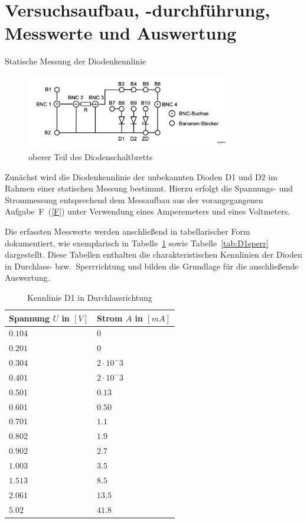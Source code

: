 \documentclass{article}
\theoremstyle{definition}
\begin{document}
\section{Versuchsaufbau, -durchführung, Messwerte und Auswertung}
\begin{aufgabe}{Statische Messung der Diodenkennlinie} 
    \aufbau
    \begin{figure}[H]
        \centering
        \includegraphics[width=0.8\textwidth]{figs/fig2_6.png}
        \caption{oberer Teil des Diodenschaltbretts\cite{anleitung}}
        \label{aufbau_2_1}
    \end{figure}
    Zunächst wird die Diodenkennlinie der unbekannten Dioden D1 und D2 im Rahmen einer statischen Messung bestimmt. 
    Hierzu erfolgt die Spannungs- und Strommessung entsprechend dem Messaufbau aus der vorangegangenen Aufgabe~F~(\ref{F}) 
    unter Verwendung eines Amperemeters und eines Voltmeters. 
    
    Die erfassten Messwerte werden anschließend in tabellarischer Form dokumentiert, wie exemplarisch in Tabelle~\ref{tab:D1duchlass} 
    sowie Tabelle~\ref{tab:D1sperr} dargestellt. Diese Tabellen enthalten die charakteristischen Kennlinien der Dioden in 
    Durchlass- bzw.\ Sperrrichtung und bilden die Grundlage für die anschließende Auswertung.
    

\begin{table}[h!]
    \centering
    \begin{tabular}{|l|l|}
    \hline
    \textbf{Spannung $U$ in $[V]$} & \textbf{Strom $A$ in $[mA]$} \\
    \hline
    $0.104$ & $0$ \\
    $0.201$ & $0$\\
    $0.304$ &  $2 \cdot 10^-3$ \\
    $0.401$ & $2 \cdot 10^-3$\\
    $0.501$ & $0.13$ \\
    $0.601$ & $0.50$ \\
    $0.701$ & $1.1$ \\
    $0.802$ & $1.9$ \\
    $0.902$ & $2.7$ \\
    $1.003$ & $3.5$ \\
    $1.513$ & $8.5$ \\
    $2.061$ & $13.5$ \\
    $5.02$ & $41.8$ \\
    \hline
    \end{tabular}
    \caption{Kennlinie D1 in Durchlassrichtung}
    \label{tab:D1duchlass}
    \end{table}
    

\end{aufgabe}
\end{document}
